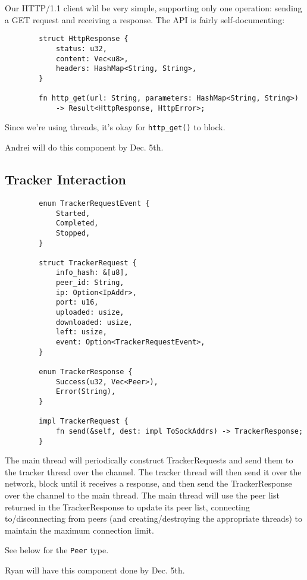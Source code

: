 \documentclass{article}
\begin{document}
    Our HTTP/1.1 client wlil be very simple, supporting only one operation: sending a GET request and receiving a response.
    The API is fairly self-documenting:

    \begin{verbatim}
        struct HttpResponse {
            status: u32,
            content: Vec<u8>,
            headers: HashMap<String, String>,
        }

        fn http_get(url: String, parameters: HashMap<String, String>)
            -> Result<HttpResponse, HttpError>;
    \end{verbatim}
    Since we're using threads, it's okay for \texttt{http\_get()} to block.

    Andrei will do this component by Dec. 5th.


    \subsection{Tracker Interaction}

    \begin{verbatim}
        enum TrackerRequestEvent {
            Started,
            Completed,
            Stopped,
        }

        struct TrackerRequest {
            info_hash: &[u8],
            peer_id: String,
            ip: Option<IpAddr>,
            port: u16,
            uploaded: usize,
            downloaded: usize,
            left: usize,
            event: Option<TrackerRequestEvent>,
        }

        enum TrackerResponse {
            Success(u32, Vec<Peer>),
            Error(String),
        }

        impl TrackerRequest {
            fn send(&self, dest: impl ToSockAddrs) -> TrackerResponse;
        }
    \end{verbatim}
    The main thread will periodically construct TrackerRequests and send them to the tracker thread over the channel.
    The tracker thread will then send it over the network, block until it receives a response, and then send the TrackerResponse over the channel to the main thread.
    The main thread will use the peer list returned in the TrackerResponse to update its peer list, connecting to/disconnecting from peers (and creating/destroying the appropriate threads) to maintain the maximum connection limit.

    See below for the \texttt{Peer} type.

    Ryan will have this component done by Dec. 5th.
\end{document}
